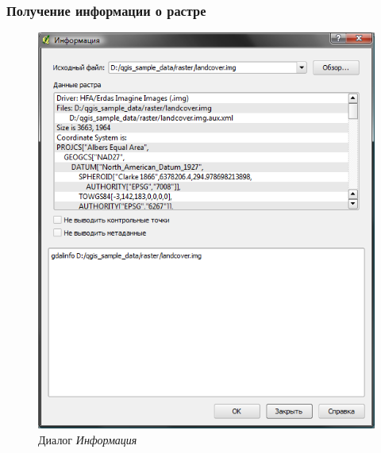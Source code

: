 {\subsubsection{Получение информации о растре}
\begin{figure}[ht]
   \centering
   \includegraphics[clip=true, width=12cm]{plugins_gdaltools_images/gdalinfo}
   \caption{\label{gdalinfo}Диалог \emph{Информация} \wincaption}
\end{figure}

}
